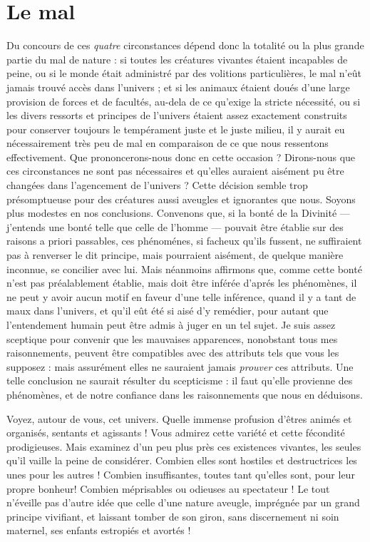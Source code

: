 
\section{Le mal}
Du concours de ces {\it quatre} circonstances dépend donc la
totalité ou la plus grande partie du mal de nature : si
toutes les créatures vivantes étaient incapables de peine,
ou si le monde était administré par des volitions particulières,
le mal n’eût jamais trouvé accès dans l’univers ;
et si les animaux étaient doués d’une large provision de
forces et de facultés, au-dela de ce qu’exige la stricte
nécessité, ou si les divers ressorts et principes de l’univers
étaient assez exactement construits pour conserver toujours
le tempérament juste et le juste milieu, il y aurait
eu nécessairement très peu de mal en comparaison de ce
que nous ressentons effectivement. Que prononcerons-nous donc
en cette occasion ? Dirons-nous que ces circonstances
ne sont pas nécessaires et qu’elles auraient
aisément pu être changées dans l’agencement de l’univers ?
Cette décision semble trop présomptueuse pour des
créatures aussi aveugles et ignorantes que nous. Soyons
plus modestes en nos conclusions. Convenons que, si la
bonté de la Divinité — j’entends une bonté telle que
celle de l’homme — pouvait être établie sur des raisons
a priori passables, ces phénoménes, si facheux qu’ils
fussent, ne suffiraient pas à renverser le dit principe,
mais pourraient aisément, de quelque manière inconnue,
se concilier avec lui. Mais néanmoins affirmons que, comme
cette bonté n’est pas préalablement établie, mais doit
être inférée d’aprés les phénomènes, il ne peut y avoir
aucun motif en faveur d’une telle inférence, quand il y a
tant de maux dans l’univers, et qu’il eût été si aisé d’y
remédier, pour autant que l’entendement humain peut
être admis à juger en un tel sujet. Je suis assez sceptique
pour convenir que les mauvaises apparences, nonobstant
tous mes raisonnements, peuvent être compatibles avec
des attributs tels que vous les supposez : mais assurément
elles ne sauraient jamais {\it prouver} ces attributs. Une telle
conclusion ne saurait résulter du scepticisme : il faut
qu’elle provienne des phénomènes, et de notre confiance
dans les raisonnements que nous en déduisons.

Voyez, autour de vous, cet univers. Quelle immense
profusion d’êtres animés et organisés, sentants et agissants !
Vous admirez cette variété et cette fécondité
prodigieuses. Mais examinez d’un peu plus près ces existences
vivantes, les seules qu’il vaille la peine de considérer.
Combien elles sont hostiles et destructrices les unes
pour les autres ! Combien insuffisantes, toutes tant qu’elles
sont, pour leur propre bonheur! Combien méprisables ou
odieuses au spectateur ! Le tout n’éveille pas d’autre idée
que celle d’une nature aveugle, imprégnée par un grand
principe vivifiant, et laissant tomber de son giron, sans
discernement ni soin maternel, ses enfants estropiés et
avortés !

